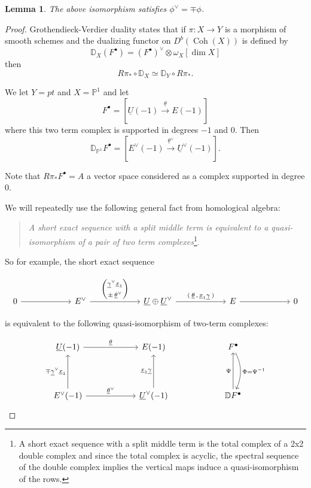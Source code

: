 \documentclass{amsart}
\newtheorem{lemma}[theorem]{Lemma}
\theoremstyle{definition}
\newcommand{\DD} {{\mathbb D}}
\newcommand{\PP}{\mathbb{P}}
\newcommand{\UL}[1]{\underline{#1}}
\newcommand{\homotopyeq}{\simeq}
\newcommand{\Rpistar}{R\pi_{*}}
\begin{document}
\begin{lemma}\label{lem: phivee = mp phi}
The above isomorphism satisfies $\phi^{\vee} = \mp \phi$. 
\end{lemma}
\begin{proof}
Grothendieck-Verdier duality \cite[Eq~3.20]{Huybrechts-FMbook} states
that if $\pi :X\to Y$ is a morphism of smooth schemes and the
dualizing functor on $D^{b}(\operatorname{Coh}(X))$ is defined by 
\[
\DD_{X}(F^{\bullet}) = (F^{\bullet})^{\vee} \otimes \omega_{X}[\dim X ]
\]
then
\[
\Rpistar \circ \DD_{X} \homotopyeq  \DD_{Y}\circ \Rpistar .
\]

We let $Y=pt$ and $X=\PP^{1}$ and let 
\[
F^{\bullet} = [\UL{U}(-1)\stackrel{\UL{\theta}}{\longrightarrow } E(-1)]
\]
where this two term complex is supported in degrees $-1$ and $0$. Then
\[
\DD_{\PP^{1}}F^{\bullet} = [E^{\vee}(-1)\stackrel{\UL{\theta}^{\vee
}}{\longrightarrow } \UL{U}^{\vee}(-1)] .
\]

Note that $\Rpistar F^{\bullet}=A$ a vector space considered as a
complex supported in degree 0.

We will repeatedly use the following general fact from homological
algebra:
\bigskip

\begin{quote}
\emph{A short exact sequence with a split middle term is equivalent to
a quasi-isomorphism of a pair of two term complexes}\footnote{A short
exact sequence with a split middle term is the total complex of a 2x2
double complex and since the total complex is acyclic, the spectral
sequence of the double complex implies the vertical maps induce a
quasi-isomorphism of the rows.}.
\end{quote}
\bigskip

So for example, the short exact sequence

\[
\begin{tikzcd}[column sep=6em]
0 \arrow[r]
& E^{\vee}
  \arrow[r,"{%
    \begin{pmatrix}
      \UL{\gamma}^{\vee}\UL{x}_{1} \\[2pt]
      \pm\,\UL{\theta}^{\vee}
    \end{pmatrix}
  }"]
& \UL{U}\oplus \UL{U}^{\vee}
  \arrow[r,"{(\:\UL{\theta}\,,\,\UL{x}_{1}\UL{\gamma}\:)}"]
& E \arrow[r]
& 0
\end{tikzcd}
\]

is equivalent to the following quasi-isomorphism of two-term complexes:


\[
\begin{tikzcd}[column sep=6em,row sep=4em]
  \UL{U}(-1)
    \arrow[r,"\UL{\theta }"]
  & E(-1)
  & F^{\bullet}
    \arrow[d,bend left=25,"\Phi=\Psi^{-1}   "]\\
  E^{\vee}(-1)
    \arrow[u,"\mp \UL{\gamma}^{\vee}\UL{x}_{1}"]
    \arrow[r,"\UL{\theta }^{\vee}"]
  & \UL{U}^{\vee }(-1)
    \arrow[u,"\UL{x}_{1}\UL{\gamma }"]
  & \DD F^{\bullet}
    \arrow[u,"\Psi  "]
\end{tikzcd}
\]


\end{proof}
\end{document}
